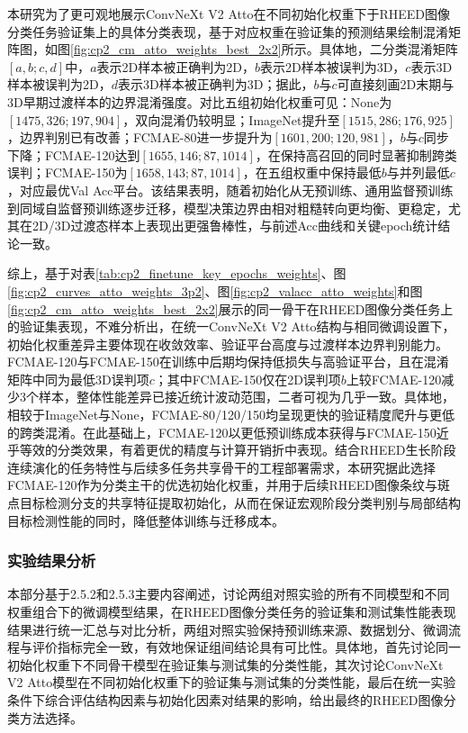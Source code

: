 本研究为了更可观地展示ConvNeXt V2 Atto在不同初始化权重下于RHEED图像分类任务验证集上的具体分类表现，基于对应权重在验证集的预测结果绘制混淆矩阵图，如图\ref{fig:cp2_cm_atto_weights_best_2x2}所示。具体地，二分类混淆矩阵\([a,b;c,d]\)中，\(a\)表示2D样本被正确判为2D，\(b\)表示2D样本被误判为3D，\(c\)表示3D样本被误判为2D，\(d\)表示3D样本被正确判为3D；据此，\(b\)与\(c\)可直接刻画2D末期与3D早期过渡样本的边界混淆强度。对比五组初始化权重可见：None为\([1475,326;\allowbreak197,904]\)，双向混淆仍较明显；ImageNet提升至\([1515,286;\allowbreak176,925]\)，边界判别已有改善；FCMAE-80进一步提升为\([1601,200;\allowbreak120,981]\)，\(b\)与\(c\)同步下降；FCMAE-120达到\([1655,146;\allowbreak87,1014]\)，在保持高召回的同时显著抑制跨类误判；FCMAE-150为\([1658,143;\allowbreak87,1014]\)，在五组权重中保持最低\(b\)与并列最低\(c\)，对应最优Val Acc平台。该结果表明，随着初始化从无预训练、通用监督预训练到同域自监督预训练逐步迁移，模型决策边界由相对粗糙转向更均衡、更稳定，尤其在2D/3D过渡态样本上表现出更强鲁棒性，与前述Acc曲线和关键epoch统计结论一致。


综上，基于对表\ref{tab:cp2_finetune_key_epochs_weights}、图\ref{fig:cp2_curves_atto_weights_3p2}、图\ref{fig:cp2_valacc_atto_weights}和图\ref{fig:cp2_cm_atto_weights_best_2x2}展示的同一骨干在RHEED图像分类任务上的验证集表现，不难分析出，在统一ConvNeXt V2 Atto结构与相同微调设置下，初始化权重差异主要体现在收敛效率、验证平台高度与过渡样本边界判别能力。FCMAE-120与FCMAE-150在训练中后期均保持低损失与高验证平台，且在混淆矩阵中同为最低3D误判项\(c\)；其中FCMAE-150仅在2D误判项\(b\)上较FCMAE-120减少3个样本，整体性能差异已接近统计波动范围，二者可视为几乎一致。具体地，相较于ImageNet与None，FCMAE-80/120/150均呈现更快的验证精度爬升与更低的跨类混淆。在此基础上，FCMAE-120以更低预训练成本获得与FCMAE-150近乎等效的分类效果，有着更优的精度与计算开销折中表现。结合RHEED生长阶段连续演化的任务特性与后续多任务共享骨干的工程部署需求，本研究据此选择FCMAE-120作为分类主干的优选初始化权重，并用于后续RHEED图像条纹与斑点目标检测分支的共享特征提取初始化，从而在保证宏观阶段分类判别与局部结构目标检测性能的同时，降低整体训练与迁移成本。

\subsubsection{实验结果分析}

本部分基于2.5.2和2.5.3主要内容阐述，讨论两组对照实验的所有不同模型和不同权重组合下的微调模型结果，在RHEED图像分类任务的验证集和测试集性能表现结果进行统一汇总与对比分析，两组对照实验保持预训练来源、数据划分、微调流程与评价指标完全一致，有效地保证组间结论具有可比性。具体地，首先讨论同一初始化权重下不同骨干模型在验证集与测试集的分类性能，其次讨论ConvNeXt V2 Atto模型在不同初始化权重下的验证集与测试集的分类性能，最后在统一实验条件下综合评估结构因素与初始化因素对结果的影响，给出最终的RHEED图像分类方法选择。

